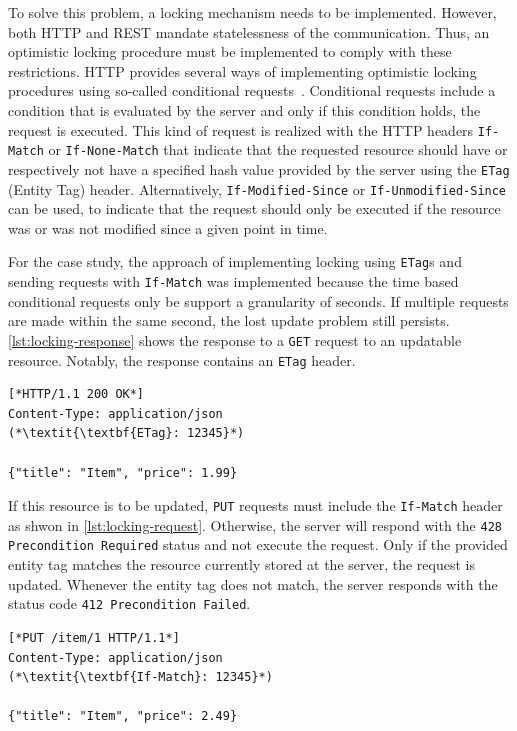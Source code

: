 To solve this problem, a locking mechanism needs to be implemented.
However, both \ac{HTTP} and \ac{REST} mandate statelessness of the communication.
Thus, an optimistic locking procedure must be implemented to comply with these restrictions.
\ac{HTTP} provides several ways of implementing optimistic locking procedures using so-called conditional requests~\cite{MDN2020}.
Conditional requests include a condition that is evaluated by the server and only if this condition holds, the request is executed.
This kind of request is realized with the \ac{HTTP} headers \texttt{If-Match} or \texttt{If-None-Match} that indicate that the requested resource should have or respectively not have a specified hash value provided by the server using the \texttt{ETag} (Entity Tag) header.
Alternatively, \texttt{If-Modified-Since} or \texttt{If-Unmodified-Since} can be used, to indicate that the request should only be executed if the resource was or was not modified since a given point in time.

For the case study, the approach of implementing locking using \texttt{ETag}s and sending requests with \texttt{If-Match} was implemented because the time based conditional requests only be support a granularity of seconds.
If multiple requests are made within the same second, the lost update problem still persists.
\autoref{lst:locking-response} shows the response to a \texttt{GET} request to an updatable resource.
Notably, the response contains an \texttt{ETag} header.

\begin{lstlisting}[caption={Response to \texttt{GET} Requests for Updatable Resources}, showlines=true, label=lst:locking-response, language=http]
[*HTTP/1.1 200 OK*]
Content-Type: application/json
(*\textit{\textbf{ETag}: 12345}*)

{"title": "Item", "price": 1.99}
\end{lstlisting}

If this resource is to be updated, \texttt{PUT} requests must include the \texttt{If-Match} header as shwon in \autoref{lst:locking-request}.
Otherwise, the server will respond with the \texttt{428 Precondition Required} status and not execute the request.
Only if the provided entity tag matches the resource currently stored at the server, the request is updated.
Whenever the entity tag does not match, the server responds with the status code \texttt{412 Precondition Failed}.

\begin{lstlisting}[caption={Request to Update Resources}, showlines=true, label=lst:locking-request, language=http]
[*PUT /item/1 HTTP/1.1*]
Content-Type: application/json
(*\textit{\textbf{If-Match}: 12345}*)

{"title": "Item", "price": 2.49}
\end{lstlisting}


